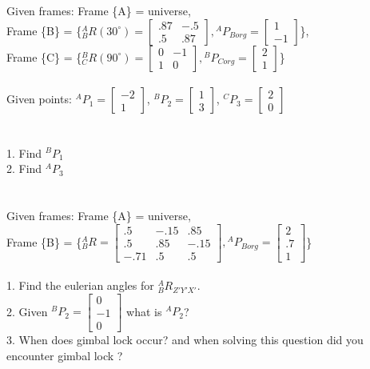 \documentclass{article}
\begin{document}
\section{}
Given frames: Frame \{A\} = universe,\\ 
Frame \{B\} = \{${}^{A}_{B}R(30^\circ)=\begin{bmatrix}
.87 & -.5 \\
.5 & .87
\end{bmatrix} ,{}^{A}P_{Borg}=\begin{bmatrix}
1  \\
-1 
\end{bmatrix} $\},\\
Frame \{C\} = \{${}^{B}_{C}R(90^\circ)=\begin{bmatrix}
0 & -1 \\
1 & 0
\end{bmatrix} ,{}^{B}P_{Corg}=\begin{bmatrix}
2  \\
1
\end{bmatrix} $\}\\\\
Given points: ${}^{A}P_{1}=\begin{bmatrix}
-2  \\
1 
\end{bmatrix}$, ${}^{B}P_{2}=\begin{bmatrix}
1  \\
3 
\end{bmatrix}$, ${}^{C}P_{3}=\begin{bmatrix}
2  \\
0 
\end{bmatrix}$\\\\\\  
1. Find ${}^{B}P_{1}$ \\
2. Find ${}^{A}P_{3}$ 
\newpage

\section{}
Given frames: Frame \{A\} = universe,\\ 
Frame \{B\} = \{${}^{A}_{B}R=\begin{bmatrix}
.5 & -.15 & .85\\
.5 & .85 & -.15 \\
-.71 & .5 & .5
\end{bmatrix} ,{}^{A}P_{Borg}=\begin{bmatrix}
2  \\
.7  \\
1
\end{bmatrix} $\}\\\\
1. Find the eulerian angles for ${}^{A}_{B}R_{Z'Y'X'}$.\\
2. Given ${}^BP_2=\begin{bmatrix}
0\\
-1\\
0
\end{bmatrix}$ what is ${}^AP_2$?\\
3. When does gimbal lock occur? and when solving this question did you encounter gimbal lock ?
\newpage
\end{document}
